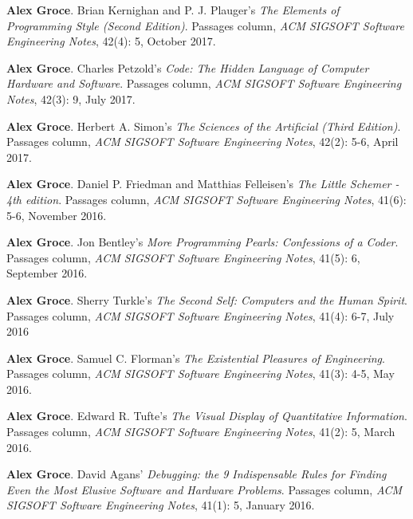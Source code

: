 \documentclass[ComputerScience]{vita}
\begin{document}
\begin{vita}
\begin{Columns, Book Reviews, and Magazine Articles}
\item {\bf Alex Groce}.
\newblock Brian Kernighan and P. J. Plauger's \emph{The Elements of Programming Style (Second Edition)}.
\newblock Passages column, \emph{ACM SIGSOFT Software Engineering Notes}, 42(4): 5, October 2017.

\item {\bf Alex Groce}.
\newblock Charles Petzold's \emph{Code: The Hidden Language of Computer Hardware and Software}.
\newblock Passages column, \emph{ACM SIGSOFT Software Engineering Notes}, 42(3): 9, July 2017.


\item {\bf Alex Groce}.
\newblock Herbert A. Simon's \emph{The Sciences of the Artificial (Third Edition)}.
\newblock Passages column, \emph{ACM SIGSOFT Software Engineering Notes}, 42(2): 5-6, April 2017.

\item {\bf Alex Groce}.
\newblock Daniel P. Friedman and Matthias Felleisen's \emph{The Little Schemer - 4th edition}.
\newblock Passages column, \emph{ACM SIGSOFT Software Engineering Notes}, 41(6): 5-6, November 2016.

\item {\bf Alex Groce}.
\newblock Jon Bentley's \emph{More Programming Pearls: Confessions of a Coder}.
\newblock Passages column, \emph{ACM SIGSOFT Software Engineering Notes}, 41(5): 6, September 2016.

\item {\bf Alex Groce}.
\newblock Sherry Turkle's \emph{The Second Self: Computers and the Human Spirit}.
\newblock Passages column, \emph{ACM SIGSOFT Software Engineering Notes}, 41(4): 6-7, July 2016

\item {\bf Alex Groce}.
\newblock Samuel C. Florman's \emph{The Existential Pleasures of Engineering}.
\newblock Passages column, \emph{ACM SIGSOFT Software Engineering Notes}, 41(3): 4-5, May 2016.


\item {\bf Alex Groce}.
\newblock Edward R. Tufte's \emph{The Visual Display of Quantitative Information}.
\newblock Passages column, \emph{ACM SIGSOFT Software Engineering Notes}, 41(2): 5, March 2016.

\item {\bf Alex Groce}.
\newblock David Agans' \emph{Debugging: the 9 Indispensable Rules for Finding Even the Most Elusive Software and Hardware Problems}. 
\newblock Passages column, \emph{ACM SIGSOFT Software Engineering Notes}, 41(1): 5, January 2016.



\end{Columns, Book Reviews, and Magazine Articles}
\end{vita}
\end{document}
